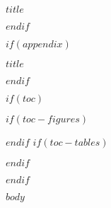\documentclass[letterpaper,12pt]{article}
\begin{document}
\newpage

\begin{center}
{\bfseries $title$}
\end{center}

$endif$

$if(appendix)$
\begin{center}
{\LARGE\bfseries $title$}
\end{center}
$endif$

$if(toc)$
{
\hypersetup{linkcolor=black}
\setcounter{tocdepth}{$toc-depth$}
\tableofcontents
$if(toc-figures)$
\listoffigures
$endif$
$if(toc-tables)$
\listoftables
$endif$
}
$endif$

\doublespacing

$body$

\newpage
\singlespacing
\printbibliography[heading=bibliography$if(reference-section-title)$, title=$reference-section-title$$endif$]
\end{document}
